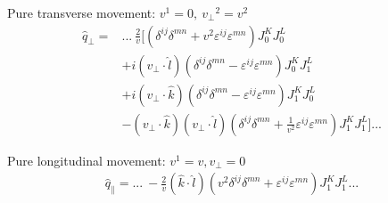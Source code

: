 Pure transverse movement: $v^1 = 0, ~ {v_\perp}^2 = v^2$
\begin{equation*}
\begin{split}
\hat{q}_\perp = & ...~ \frac{2}{v} \Bigg[(\delta^{ij} \delta^{mn} + v^2 \varepsilon^{ij} \varepsilon^{mn}) J_0 ^K J_0^L \\
& + i (v_\perp \cdot \hat{l}) (\delta^{ij} \delta^{mn} - \varepsilon^{ij} \varepsilon^{mn}) J_0 ^K J_1^L \\
& + i (v_\perp \cdot \hat{k}) (\delta^{ij} \delta^{mn} - \varepsilon^{ij} \varepsilon^{mn}) J_1 ^K J_0^L \\
&-  (v_\perp \cdot \hat{k}) (v_\perp \cdot \hat{l}) \left( \delta^{ij} \delta^{mn} + \frac{1}{v^2} \varepsilon^{ij}\varepsilon^{mn} \right)  J_1 ^K J_1^L \Bigg] ...
\end{split}
\end{equation*}

Pure longitudinal movement: $v^1 = v, v_\perp=0$
\begin{equation*}
\begin{split}
\hat{q}_\parallel = ...~ - \frac{2}{v} (\hat{k} \cdot \hat{l}) \left( v^2 \delta^{ij} \delta^{mn} + \varepsilon^{ij}\varepsilon^{mn} \right)  J_1 ^K J_1^L ...
\end{split}
\end{equation*}

